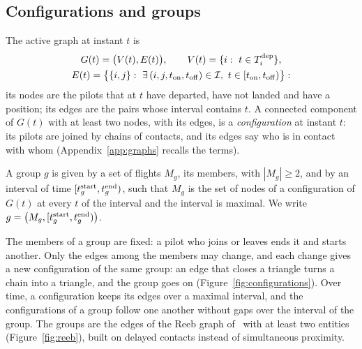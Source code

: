\subsection{Configurations and groups}\label{sec:configurations}

The active graph at instant $t$ is
\begin{equation}\label{eq:graph}
  \begin{gathered}
  G(t)=\bigl(V(t),E(t)\bigr),\qquad V(t)=\{i:\ t\in T^\dep_i\},\\
  E(t)=\bigl\{\{i,j\}:\ \exists\,(i,j,t_{\rm on},t_{\rm off})\in\I,\ t\in[t_{\rm on},t_{\rm off})\bigr\}:
  \end{gathered}
\end{equation}
its nodes are the pilots that at $t$ have departed, have not landed and have a position; its edges
are the pairs whose interval contains $t$. A connected component of $G(t)$ with at least two nodes,
with its edges, is a \emph{configuration} at instant $t$: its pilots are joined by chains of
contacts, and its edges say who is in contact with whom (Appendix~\ref{app:graphs} recalls the
terms).

\begin{definition}[group]
A group $g$ is given by a set of flights $M_g$, its members, with $|M_g|\ge2$, and by an interval
of time $[t^{\rm start}_g, t^{\rm end}_g)$, such that $M_g$ is the set of nodes of a configuration
of $G(t)$ at every $t$ of the interval and the interval is maximal. We write
$g=\bigl(M_g,[t^{\rm start}_g,t^{\rm end}_g)\bigr)$.
\end{definition}

The members of a group are fixed: a pilot who joins or leaves ends it and starts another. Only
the edges among the members may change, and each change gives a new configuration of the same
group: an edge that closes a triangle turns a chain into a triangle, and the group goes on
(Figure~\ref{fig:configurations}). Over time, a configuration keeps its edges over a maximal
interval, and the configurations of a group follow one another without gaps over the interval of
the group. The groups are the edges of the Reeb graph of~\cite{buchin2015} with at least two
entities (Figure~\ref{fig:reeb}), built on delayed contacts instead of simultaneous proximity.

